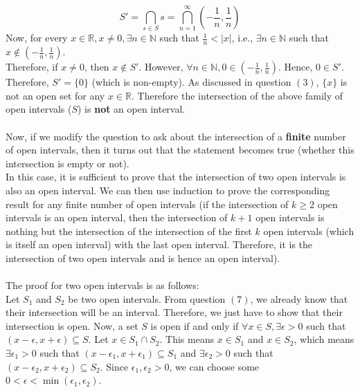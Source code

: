 \documentclass{article}
\begin{document}
\begin{enumerate}
	\begin{equation*}
		S' = \bigcap_{s \in S} s = \bigcap_{n = 1}^{\infty} (-\frac{1}{n}, \frac{1}{n})
	\end{equation*}
	Now, for every $x \in \mathbb{R}, x \neq 0, \exists n \in \mathbb{N}$ such that $\frac{1}{n} < |x|$, i.e., $\exists n \in \mathbb{N}$ such that $x \notin (-\frac{1}{n}, \frac{1}{n})$.
	\\Therefore, if $x \neq 0$, then $x \notin S'$.
	However, $\forall n \in \mathbb{N}, 0 \in (-\frac{1}{n}, \frac{1}{n})$. Hence, $0 \in S'$.
	\\Therefore, $S' = \{0\}$ (which is non-empty). As discussed in question $(3)$, $\{x\}$ is not an open set for any $x \in \mathbb{R}$. Therefore the intersection of the above family of open intervals ($S$) is \textbf{not} an open interval.
	\\\\Now, if we modify the question to ask about the intersection of a \textbf{finite} number of open intervals, then it turns out that the statement becomes true (whether this intersection is empty or not).
	\\In this case, it is sufficient to prove that the intersection of two open intervals is also an open interval. We can then use induction to prove the corresponding result for any finite number of open intervals
	(if the intersection of $k \geq 2$ open intervals is an open interval, then the intersection of $k+1$ open intervals is nothing but the intersection of the intersection of the first $k$ open intervals (which is itself an open interval) with the last open interval. Therefore, it is the intersection of two open intervals and is hence an open interval).
	\\\\The proof for two open intervals is as follows:
	\\Let $S_{1}$ and $S_{2}$ be two open intervals. From question $(7)$, we already know that their intersection will be an interval. Therefore, we just have to show that their intersection is open.
	Now, a set $S$ is open if and only if $\forall x \in S, \exists \epsilon > 0$ such that $(x - \epsilon, x + \epsilon) \subseteq S$. Let $x \in S_{1} \cap S_{2}$. This means $x \in S_{1}$ and $x \in S_{2}$, which means
	$\exists \epsilon_{1} > 0$ such that $(x - \epsilon_{1}, x + \epsilon_{1}) \subseteq S_{1}$ and $\exists \epsilon_{2} > 0$ such that $(x - \epsilon_{2}, x + \epsilon_{2}) \subseteq S_{2}$. Since $\epsilon_{1}, \epsilon_{2} > 0$, we can choose some $0 < \epsilon < \min(\epsilon_{1}, \epsilon_{2})$.

\end{enumerate}
\end{document}
